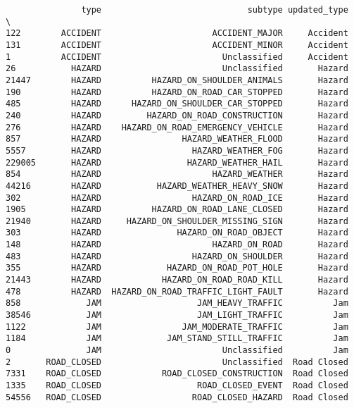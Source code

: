 \documentclass[
  letterpaper,
  DIV=11,
  numbers=noendperiod]{scrartcl}
\begin{document}
\begin{verbatim}
               type                             subtype updated_type  \
122        ACCIDENT                      ACCIDENT_MAJOR     Accident   
131        ACCIDENT                      ACCIDENT_MINOR     Accident   
1          ACCIDENT                        Unclassified     Accident   
26           HAZARD                        Unclassified       Hazard   
21447        HAZARD          HAZARD_ON_SHOULDER_ANIMALS       Hazard   
190          HAZARD          HAZARD_ON_ROAD_CAR_STOPPED       Hazard   
485          HAZARD      HAZARD_ON_SHOULDER_CAR_STOPPED       Hazard   
240          HAZARD         HAZARD_ON_ROAD_CONSTRUCTION       Hazard   
276          HAZARD    HAZARD_ON_ROAD_EMERGENCY_VEHICLE       Hazard   
857          HAZARD                HAZARD_WEATHER_FLOOD       Hazard   
5557         HAZARD                  HAZARD_WEATHER_FOG       Hazard   
229005       HAZARD                 HAZARD_WEATHER_HAIL       Hazard   
854          HAZARD                      HAZARD_WEATHER       Hazard   
44216        HAZARD           HAZARD_WEATHER_HEAVY_SNOW       Hazard   
302          HAZARD                  HAZARD_ON_ROAD_ICE       Hazard   
1905         HAZARD          HAZARD_ON_ROAD_LANE_CLOSED       Hazard   
21940        HAZARD     HAZARD_ON_SHOULDER_MISSING_SIGN       Hazard   
303          HAZARD               HAZARD_ON_ROAD_OBJECT       Hazard   
148          HAZARD                      HAZARD_ON_ROAD       Hazard   
483          HAZARD                  HAZARD_ON_SHOULDER       Hazard   
355          HAZARD             HAZARD_ON_ROAD_POT_HOLE       Hazard   
21443        HAZARD            HAZARD_ON_ROAD_ROAD_KILL       Hazard   
478          HAZARD  HAZARD_ON_ROAD_TRAFFIC_LIGHT_FAULT       Hazard   
858             JAM                   JAM_HEAVY_TRAFFIC          Jam   
38546           JAM                   JAM_LIGHT_TRAFFIC          Jam   
1122            JAM                JAM_MODERATE_TRAFFIC          Jam   
1184            JAM             JAM_STAND_STILL_TRAFFIC          Jam   
0               JAM                        Unclassified          Jam   
2       ROAD_CLOSED                        Unclassified  Road Closed   
7331    ROAD_CLOSED            ROAD_CLOSED_CONSTRUCTION  Road Closed   
1335    ROAD_CLOSED                   ROAD_CLOSED_EVENT  Road Closed   
54556   ROAD_CLOSED                  ROAD_CLOSED_HAZARD  Road Closed   


\end{verbatim}
\end{document}
